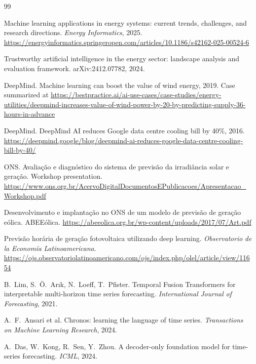 \documentclass[10pt,a4paper,oneside]{article}
\begin{document}
\begin{thebibliography}{99}
\small

Machine learning applications in energy systems: current trends, challenges,
and research directions. \textit{Energy Informatics}, 2025.
\url{https://energyinformatics.springeropen.com/articles/10.1186/s42162-025-00524-6}

Trustworthy artificial intelligence in the energy sector: landscape analysis
and evaluation framework. arXiv:2412.07782, 2024.

DeepMind. Machine learning can boost the value of wind energy, 2019. Case
summarized at
\url{https://bestpractice.ai/ai-use-cases/case-studies/energy-utilities/deepmind-increases-value-of-wind-power-by-20-by-predicting-supply-36-hours-in-advance}

DeepMind. DeepMind AI reduces Google data centre cooling bill by 40\%, 2016.
\url{https://deepmind.google/blog/deepmind-ai-reduces-google-data-centre-cooling-bill-by-40/}

ONS. Avaliação e diagnóstico do sistema de previsão da irradiância solar e
geração. Workshop presentation.
\url{https://www.ons.org.br/AcervoDigitalDocumentosEPublicacoes/Apresentacao_Workshop.pdf}

Desenvolvimento e implantação no ONS de um modelo de previsão de geração
eólica. ABEEólica.
\url{https://abeeolica.org.br/wp-content/uploads/2017/07/Art.pdf}

Previsão horária de geração fotovoltaica utilizando deep learning.
\textit{Observatorio de la Economía Latinoamericana}.
\url{https://ojs.observatoriolatinoamericano.com/ojs/index.php/olel/article/view/11654}

B.~Lim, S.~Ö.~Arık, N.~Loeff, T.~Pfister. Temporal Fusion Transformers for
interpretable multi-horizon time series forecasting. \textit{International
Journal of Forecasting}, 2021.

A.~F.~Ansari et al. Chronos: learning the language of time series.
\textit{Transactions on Machine Learning Research}, 2024.

A.~Das, W.~Kong, R.~Sen, Y.~Zhou. A decoder-only foundation model for
time-series forecasting. \textit{ICML}, 2024.


\end{thebibliography}
\end{document}
